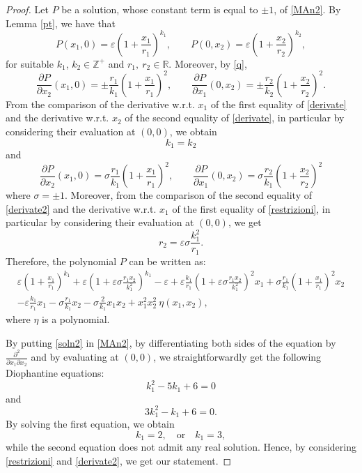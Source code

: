 \documentclass[11pt, reqno]{amsart}
\newcommand{\Z}{\mathds{Z}}
\newcommand{\R}{\mathds{R}}
\newcommand{\e}{\varepsilon}
\begin{document}
\begin{proof}
Let $P$ be  a solution, whose  constant term is equal to $\pm1$, of  \eqref{MAn2}. By Lemma \ref{pt}, we have that
 \begin{equation}\label{restrizioni}
P(x_1,0)=\e\left(1+\frac{x_1}{r_1} \right)^{k_1},\qquad  P(0, x_2)=\e\left(1+\frac{x_2}{r_2} \right)^{k_2}, \end{equation}
 for suitable $k_1$, $k_2\in\Z^+$ and $r_1,\ r_2\in\R$.  Moreover, by  \eqref{q},
 \begin{equation}\label{derivate}
\frac{\partial P}{\partial x_2}(x_1,0)=\pm\frac{r_1}{k_1} \left( 1+\frac{x_1}{r_1}\right)^{2},\qquad \frac{\partial P}{\partial x_1}(0,x_2)=\pm\frac{r_2}{k_2} \left( 1+\frac{x_2}{r_2}\right)^2.\end{equation}
From the comparison of the derivative w.r.t. $x_1$ of the first equality of \eqref{derivate} and the  derivative w.r.t. $x_2$ of the second equality of \eqref{derivate}, in particular by considering their evaluation at $(0,0)$, we obtain
$$k_1=k_2$$
and 
\begin{equation}\label{derivate2}
\frac{\partial P}{\partial x_2}(x_1,0)=\sigma\frac{r_1}{k_1} \left( 1+\frac{x_1}{r_1}\right)^{2},\qquad \frac{\partial P}{\partial x_1}(0,x_2)=\sigma\frac{r_2}{k_1} \left( 1+\frac{x_2}{r_2}\right)^2\end{equation}
where $\sigma=\pm1$.
Moreover, from the comparison of the second equality of \eqref{derivate2} and the  derivative w.r.t. $x_1$ of the first equality of \eqref{restrizioni}, in particular by considering their evaluation at $(0,0)$, we get 
$$r_2=\e\sigma\frac{k_1^2}{r_1}.$$
%
Therefore, the polynomial $P$ can be written as:
\begin{multline}\label{soln2}
\e \left(1+\frac{x_1}{r_1} \right)^{k_1}+\e\left(1+\e\sigma\frac{r_1 x_2}{k_1^2} \right)^{k_1}-\e
+\e\frac{k_1 }{r_1} \left( 1+\e\sigma\frac{r_1x_2 }{k_1^2}\right)^2x_1+\sigma \frac{r_1 }{k_1} \left( 1+\frac{x_1}{r_1}\right)^{2}x_2\\
-\e\frac{k_1}{r_1}  x_1-\sigma\frac{r_1}{k_1} x_2-\sigma\frac{2}{k_1}x_1x_2+x_1^2x_2^2\ \eta(x_1,x_2),
\end{multline}
where $\eta$ is a polynomial.



By putting \eqref{soln2} in  \eqref{MAn2}, by differentiating both sides of the equation by $\frac{\partial^2}{\partial x_1\partial x_2}$ and by evaluating at $(0,0)$,
we straightforwardly get the following Diophantine equations:
$$k_1^2-5k_1+6=0$$
and
$$3k_1^2-k_1+6=0.$$
By solving the first equation,  we obtain
$$k_1=2,\quad \text{or}\quad k_1=3,$$
while the second equation does not admit any real solution.
Hence, by considering \eqref{restrizioni} and \eqref{derivate2}, we get our statement.
\end{proof}
\end{document}
